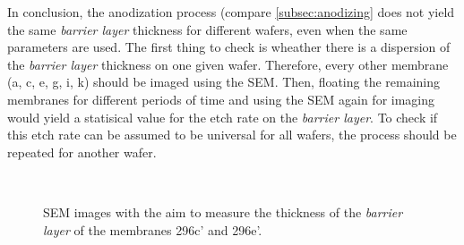 \documentclass[../thesis.tex]{subfiles}
\begin{document}
          In conclusion, the anodization process (compare \cref{subsec:anodizing} does not yield the same \textit{barrier layer} thickness for different wafers, even when the same parameters are used. The first thing to check is wheather there is a dispersion of the \textit{barrier layer} thickness on one given wafer. Therefore, every other membrane (a, c, e, g, i, k) should be imaged using the SEM. Then, floating the remaining membranes for different periods of time and using the SEM again for imaging would yield a statisical value for the etch rate on the \textit{barrier layer}. To check if this etch rate can be assumed to be universal for all wafers, the process should be repeated for another wafer.

          \begin{figure}[p]
            \centering
             \\
            \caption{SEM images with the aim to measure the thickness of the \textit{barrier layer} of the membranes 296c' and 296e'.}
            \label{fig:barrier-layer-sems}
          \end{figure}
\end{document}
